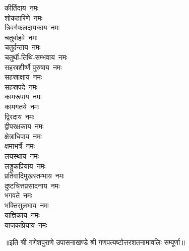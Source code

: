 \begin{multicols}{2}
\begin{flushleft}
कीर्तिदाय~नमः\\
शोकहारिणे~नमः\\
त्रिवर्गफलदायकाय~नमः\\
चतुर्बाहवे~नमः\\
चतुर्दन्ताय~नमः\hfill{}\\
चतुर्थी-तिथि-सम्भवाय~नमः\\
सहस्रशीर्ष्णे पुरुषाय~नमः\\
सहस्राक्षाय~नमः\\
सहस्रपदे~नमः\\
कामरूपाय~नमः\\
कामगतये~नमः\\
द्विरदाय~नमः\\
द्वीपरक्षकाय~नमः\\
क्षेत्राधिपाय~नमः\\
क्षमाभर्त्रे~नमः\hfill{}\\
लयस्थाय~नमः\\
लड्डुकप्रियाय~नमः\\
प्रतिवादिमुखस्तम्भाय~नमः\\
दुष्टचित्तप्रसादनाय~नमः\\
भगवते~नमः\\
भक्तिसुलभाय~नमः\\
याज्ञिकाय~नमः\\
याजकप्रियाय~नमः\\
\end{flushleft}
\end{multicols}
॥इति श्री गणेशपुराणे उपासनाखण्डे श्री गणपत्यष्टोत्तरशतनामावलिः सम्पूर्णा॥
